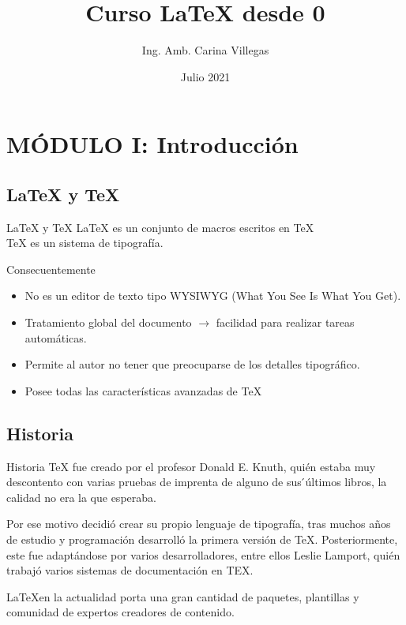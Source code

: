 \documentclass{beamer}
\title{Curso \LaTeX{} desde 0}
\author{Ing. Amb. Carina Villegas}
\date{Julio 2021}
\begin{document}
\frame{\titlepage}
 
\section{MÓDULO I: Introducción}
\subsection{\LaTeX{} y \TeX}
\begin{frame}{\LaTeX{} y \TeX}
\LaTeX{} es un conjunto de macros escritos en \TeX{}  \\ %
\TeX{} es un sistema de tipografía.

\begin{block}{Consecuentemente} %
\begin{itemize}
\item No es un editor de texto tipo WYSIWYG (What You See Is What You Get).
\item Tratamiento global del documento $\rightarrow$ facilidad para realizar tareas automáticas.
\item Permite al autor no tener que preocuparse de los detalles tipográfico.
\item Posee todas las características avanzadas de \TeX{}
\end{itemize}
\end{block}
\end{frame}

\subsection{Historia}
\begin{frame}{Historia}
\justify
\TeX{} fue creado por el profesor Donald E. Knuth, quién estaba muy descontento con varias pruebas de imprenta de alguno de sus ́últimos libros, la calidad no era la que esperaba.

Por ese motivo decidió crear su propio lenguaje de tipografía, tras muchos años de estudio y programación desarrolló la primera versión de \TeX{}. Posteriormente, este fue adaptándose por varios desarrolladores, entre ellos Leslie Lamport, quién trabajó varios sistemas de documentación en TEX.

\LaTeX en la actualidad porta una gran cantidad de paquetes, plantillas y comunidad de expertos creadores de contenido. 
\end{frame}
\end{document}
